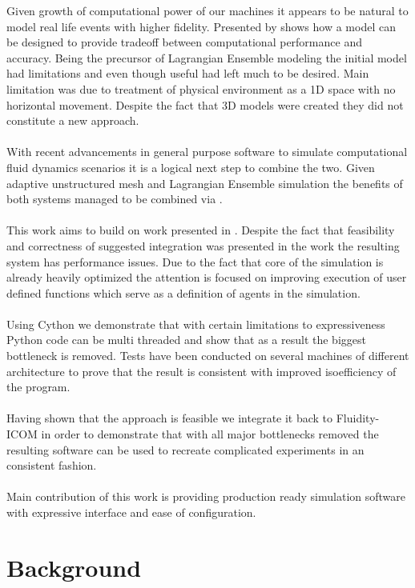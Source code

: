 \documentclass[12pt, a4paper]{report}
\begin{document}
Given growth of computational power of our machines it appears to be natural to model real life events with
higher fidelity. Presented by \cite{Woods2005} shows how a model can be designed to provide tradeoff between
computational performance and accuracy. Being the precursor of Lagrangian Ensemble modeling the initial
model had limitations and even though useful had left much to be desired. Main limitation was due to treatment
of physical environment as a 1D space with no horizontal movement. Despite the fact that 3D models were created \cite{VEW3D}
they did not constitute a new approach.
\\\\
With recent advancements in general purpose software to simulate computational fluid dynamics \cite{Piggot2008,fluidity}
scenarios it is a logical next step to combine the two. Given adaptive unstructured mesh and Lagrangian Ensemble simulation
the benefits of both systems managed to be combined via \cite{FluidityVEW}.
\\\\
This work aims to build on work presented in \cite{FluidityVEW}. Despite the fact that feasibility and correctness of
suggested integration was presented in the work the resulting system has performance issues. Due to the fact that
core of the simulation is already heavily optimized the attention is focused on improving execution of user defined functions
which serve as a definition of agents in the simulation.
\\\\
Using Cython we demonstrate that with certain limitations to expressiveness Python code can be multi threaded and show
that as a result the biggest bottleneck is removed. Tests have been conducted on several machines of different architecture
to prove that the result is consistent with improved isoefficiency of the program.
\\\\
Having shown that the approach is feasible we integrate it back to Fluidity-ICOM in order to demonstrate that with all
major bottlenecks removed the resulting software can be used to recreate complicated experiments in an consistent fashion.
\\\\
Main contribution of this work is providing production ready simulation software with expressive interface and ease of
configuration.

\chapter{Background}\label{ch:bkg}
\end{document}
